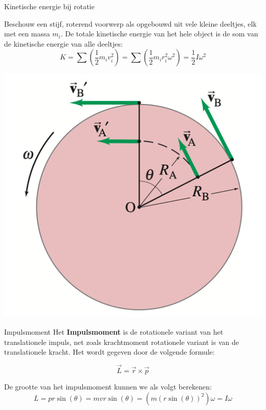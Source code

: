 \newpage

\begin{app}{Kinetische energie bij rotatie}
    \vspace{-0.5cm}
    \begin{minipage}{.69\textwidth}
        Beschouw een stijf, roterend voorwerp als opgebouwd uit vele kleine deeltjes, elk met een massa $m_i$. De totale kinetische energie van het hele object is de som van de kinetische energie van alle deeltjes:
        \begin{equation*}
            K = \sum(\dfrac{1}{2}m_i v_i^2) = \sum(\dfrac{1}{2}m_i r_i^2\omega^2) =  \dfrac{1}{2}I\omega^2
        \end{equation*}
    \end{minipage} 
    \begin{minipage}{.27\textwidth}
        \centering
        \includegraphics[scale = 0.15]{Images/Dynamica/SnelhedenOpRotatie.png}
    \end{minipage}
\end{app}

\begin{theo}[Impulsmoment]{Impulsmoment}
     Het \textbf{Impulsmoment} is de rotationele variant van het translationele impuls, net zoals krachtmoment rotationele variant is van de translationele kracht. Het wordt gegeven door de volgende formule:
    
     \begin{equation*}
         \Vec{L} = \Vec{r} \times \Vec{p}
     \end{equation*}

     \noindent De grootte van het impulsmoment kunnen we als volgt berekenen:
     \begin{equation*}
         L = p r \sin(\theta) = m v r \sin(\theta) = (m{(r \sin(\theta))}^2)\omega = I\omega
     \end{equation*}
     \vspace{-0.5cm}
\end{theo}

